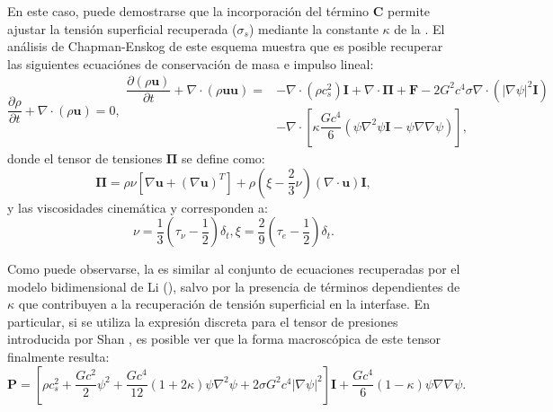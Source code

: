 En este caso, puede demostrarse que la incorporaci\'on del t\'ermino $\bm{C}$ permite  ajustar la tensi\'on superficial recuperada ($\sigma_s$) mediante la constante $\kappa$ de la . El an\'alisis de Chapman-Enskog de este esquema muestra que es posible recuperar las siguientes ecuaci\'ones de conservaci\'on de masa e impulso lineal:
\begin{subequations}
	\begin{equation}
		\dfrac{\partial \rho}{\partial t} + \nabla \cdot (\rho \bm{u}) = 0,
	\end{equation}
	\begin{equation}
		\begin{aligned}
		\dfrac{\partial(\rho\bm{u})}{\partial t} + \nabla \cdot (\rho \bm{u} \bm{u})  = &-\nabla \cdot(\rho c_s^2)\bm{I} + \nabla \cdot \bm{\Pi} + \bm{F} - 2G^2 c^4 \sigma \nabla \cdot (|\nabla \psi|^2 \bm{I}) \\
		& -\nabla \cdot \left[ \kappa \dfrac{Gc^4}{6} (\psi \nabla^2 \psi \bm{I} - \psi \nabla \nabla \psi) \right],
		\end{aligned}
	\end{equation}
	\label{eq:xu_macro}
\end{subequations}
donde el tensor de tensiones $\bm{\Pi}$ se define como:
\begin{equation}
	\bm{\Pi} = \rho \nu \left[ \nabla \bm{u} + (\nabla \bm{u})^T \right] + \rho \left( \xi - \dfrac{2}{3}\nu \right) (\nabla \cdot \bm{u})\bm{I},
\end{equation}
y las viscosidades cinem\'atica y  corresponden a:
\begin{subequations}
	\begin{equation}
		\nu = \dfrac{1}{3} \left( \tau_{\nu} - \dfrac{1}{2}\right) \delta_t,
	\end{equation}
	\begin{equation}
		\xi = \dfrac{2}{9} \left( \tau_{e} - \dfrac{1}{2}\right) \delta_t.
	\end{equation}	
\end{subequations}

Como puede observarse, la  es similar al conjunto de ecuaciones recuperadas por el modelo bidimensional de Li (), salvo por la presencia de t\'erminos dependientes de $\kappa$ que contribuyen a la recuperaci\'on de tensi\'on superficial en la interfase. En particular, si se utiliza la expresi\'on discreta para el tensor de presiones introducida por Shan \cite{shan_pressure_2008}, es posible ver que la forma macrosc\'opica de este tensor finalmente resulta:
\begin{equation}
	\bm{P} = \left[ \rho c_s^2 + \dfrac{G c^2}{2} \psi^2 + \dfrac{G c^4}{12} (1+2\kappa) \psi \nabla^2 \psi + 2 \sigma G^2 c^4 |\nabla \psi|^2\right] \bm{I} + \dfrac{G c^4}{6} (1-\kappa) \psi \nabla \nabla \psi.
	\label{eq:PTens_Xu}
\end{equation}


